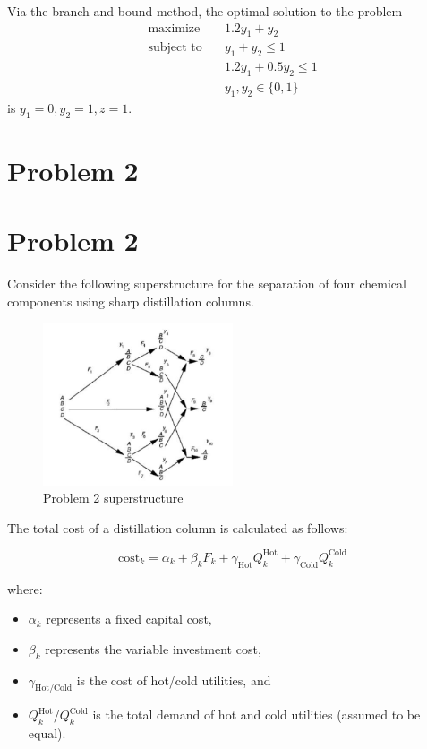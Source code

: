 \documentclass[11pt]{article}
\begin{document}
Via the branch and bound method, the optimal solution to the problem
\begin{align*}
  \text{maximize} & \quad 1.2y_1 + y_2 \\
  \text{subject to} & \quad y_1 + y_2 \leq 1 \\
  & \quad 1.2y_1 + 0.5y_2 \leq 1 \\
  & \quad y_1, y_2 \in \{ 0,1 \}
\end{align*}
is $y_1=0,y_2=1,z=1$.

\section{Problem 2}
\label{prob2}
\section{Problem 2}
\label{prob2}

Consider the following superstructure for the separation of four chemical components using sharp distillation columns. 
\begin{figure}[htbp]
  \centerline{\includegraphics[width=0.50\textwidth]{images/prob2_superstructure.png}}
  \caption{Problem 2 superstructure}
  \label{fig:prob2_superstructure}
\end{figure}
The total cost of a distillation column is calculated as follows:

\[
\text{cost}_k = \alpha_k + \beta_k F_k + \gamma_\text{Hot} Q_k^\text{Hot} + \gamma_\text{Cold} Q_k^\text{Cold}
\]

where:
\begin{itemize}
  \item $\alpha_k$ represents a fixed capital cost,
  \item $\beta_k$ represents the variable investment cost,
  \item $\gamma_{\text{Hot}/\text{Cold}}$ is the cost of hot/cold utilities, and
  \item $Q_k^\text{Hot}/Q_k^\text{Cold}$ is the total demand of hot and cold utilities (assumed to be equal).
\end{itemize}
\end{document}
